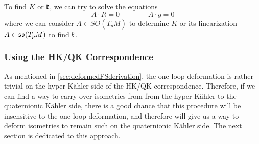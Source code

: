 To find $K$ or $\mathfrak{k}$, we can try to solve the equations
\begin{equation*}
	A \cdot R=0 \qquad \qquad A\cdot g=0
\end{equation*}
where we can consider $A\in SO(T_p M)$ to determine $K$ or its linearization $A\in \mathfrak{so}(T_p M)$ to find $\mathfrak{k}$.

\subsubsection{Using the HK/QK Correspondence}

As mentioned in \cref{sec:deformedFSderivation}, the one-loop deformation is rather trivial on the hyper-K\"ahler side of the HK/QK correspondence. Therefore, if we can find a way to carry over isometries from from the hyper-K\"ahler to the quaternionic K\"ahler side, there is a good chance that this procedure will be insensitive to the one-loop deformation, and therefore will give us a way to deform isometries to remain such on the quaternionic K\"ahler side. The next section is dedicated to this approach.